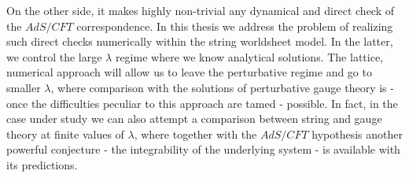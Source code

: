 On the other side, it makes highly non-trivial any dynamical and direct check of the $AdS/CFT$ correspondence. In this thesis we address the problem of realizing such direct checks numerically within the string worldsheet model. In the latter, we control the large $\lambda$ regime where we know analytical solutions. The lattice, numerical approach will allow us to leave the perturbative regime and go to smaller $\lambda$, where
comparison with the solutions of  perturbative gauge theory is - once the difficulties peculiar to this approach are tamed - possible.
In fact, in the case under study we can also attempt a comparison between string and gauge theory at finite values of $\lambda$, where together with the $AdS/CFT$ hypothesis another powerful conjecture - the integrability of the underlying system -  is available with its predictions.
%
%
%
%
%
%
%
%
